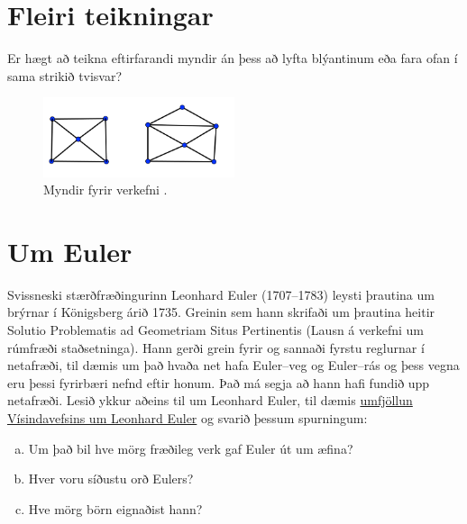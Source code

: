 \documentclass[b5paper,12pt]{book}
\renewcommand*\thesection{\arabic{section}}
\begin{document}
\section{Fleiri teikningar}
Er hægt að teikna eftirfarandi myndir án þess að lyfta blýantinum eða fara ofan í sama strikið tvisvar?

\begin{figure}[h]
  \includegraphics[width=0.5\textwidth, center]{Myndir/Eulerspurning3.png}
  \caption*{Myndir fyrir verkefni \thesection{}.}
\end{figure}

\section{Um Euler}
Svissneski stærðfræðingurinn Leonhard Euler (1707–1783) leysti þrautina um brýrnar í Königsberg árið 1735. Greinin sem hann skrifaði um þrautina heitir Solutio Problematis ad Geometriam Situs Pertinentis (Lausn á verkefni um rúmfræði staðsetninga). Hann gerði grein fyrir og sannaði fyrstu reglurnar í netafræði, til dæmis um það hvaða net hafa Euler--veg og Euler--rás og þess vegna eru þessi fyrirbæri nefnd eftir honum. Það má segja að hann hafi fundið upp netafræði. Lesið ykkur aðeins til um Leonhard Euler, til dæmis \href {http://www.visindavefur.is/svar.php?id=60127} {umfjöllun Vísindavefsins um Leonhard Euler} og svarið þessum spurningum:
\begin{enumerate}[(a)]
    \item Um það bil hve mörg fræðileg verk gaf Euler út um æfina? 
    \item Hver voru síðustu orð Eulers?
    \item Hve mörg börn eignaðist hann?
\end{enumerate}
\end{document}
